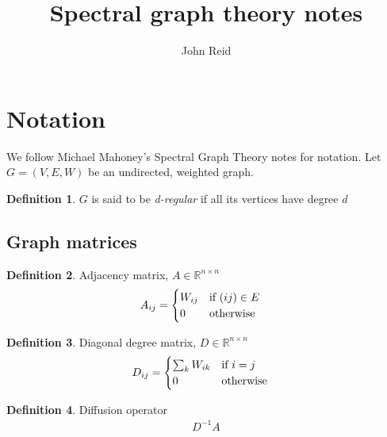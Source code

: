 \documentclass{article}
\title{Spectral graph theory notes}
\author{John Reid}
\theoremstyle{definition}
\newtheorem{definition}{Definition}[section]
\begin{document}
\maketitle



\section{Notation}

We follow Michael Mahoney's Spectral Graph Theory notes for notation.  Let $G =
(V, E, W)$ be an undirected, weighted graph.

\theoremstyle{definition}
\begin{definition}{$G$ is said to be \emph{d-regular} if all its vertices have degree $d$}
\end{definition}


\subsection{Graph matrices}

\theoremstyle{definition}
\begin{definition}{Adjacency matrix, $A \in \mathbb{R}^{n \times n}$}
  \begin{align*}
    A_{ij} &=
    \begin{cases}
      W_{ij} & \textnormal{if } (ij) \in E \\
      0      & \textnormal{otherwise}
    \end{cases}
  \end{align*}
\end{definition}


\theoremstyle{definition}
\begin{definition}{Diagonal degree matrix, $D \in \mathbb{R}^{n \times n}$}
  \begin{align*}
    D_{ij} &=
    \begin{cases}
      \sum_k W_{ik} & \textnormal{if } i = j \\
      0             & \textnormal{otherwise}
    \end{cases}
  \end{align*}
\end{definition}


\theoremstyle{definition}
\begin{definition}{Diffusion operator}
  \begin{align*}
    D^{-1}A
  \end{align*}
\end{definition}
\end{document}
